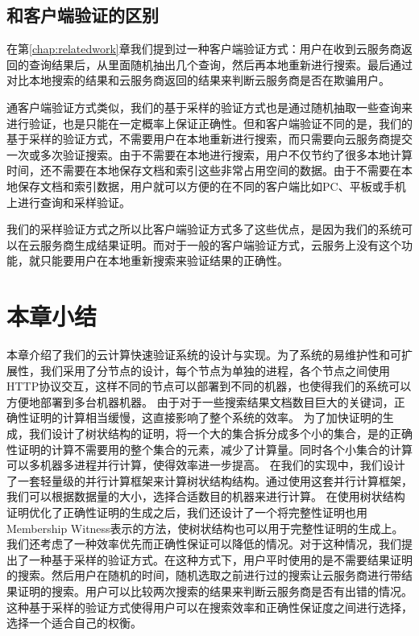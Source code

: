 \subsection{和客户端验证的区别}
在第\ref{chap:relatedwork}章我们提到过一种客户端验证方式：用户在收到云服务商返回的查询结果后，从里面随机抽出几个查询，然后再本地重新进行搜索。最后通过对比本地搜索的结果和云服务商返回的结果来判断云服务商是否在欺骗用户。

通客户端验证方式类似，我们的基于采样的验证方式也是通过随机抽取一些查询来进行验证，也是只能在一定概率上保证正确性。但和客户端验证不同的是，我们的基于采样的验证方式，不需要用户在本地重新进行搜索，而只需要向云服务商提交一次或多次验证搜索。由于不需要在本地进行搜索，用户不仅节约了很多本地计算时间，还不需要在本地保存文档和索引这些非常占用空间的数据。由于不需要在本地保存文档和索引数据，用户就可以方便的在不同的客户端比如PC、平板或手机上进行查询和采样验证。

我们的采样验证方式之所以比客户端验证方式多了这些优点，是因为我们的系统可以在云服务商生成结果证明。而对于一般的客户端验证方式，云服务上没有这个功能，就只能要用户在本地重新搜索来验证结果的正确性。

\section{本章小结}
本章介绍了我们的云计算快速验证系统的设计与实现。为了系统的易维护性和可扩展性，我们采用了分节点的设计，每个节点为单独的进程，各个节点之间使用HTTP协议交互，这样不同的节点可以部署到不同的机器，也使得我们的系统可以方便地部署到多台机器机器。
由于对于一些搜索结果文档数目巨大的关键词，正确性证明的计算相当缓慢，这直接影响了整个系统的效率。
为了加快证明的生成，我们设计了树状结构的证明，将一个大的集合拆分成多个小的集合，是的正确性证明的计算不需要用的整个集合的元素，减少了计算量。同时各个小集合的计算可以多机器多进程并行计算，使得效率进一步提高。
在我们的实现中，我们设计了一套轻量级的并行计算框架来计算树状结构结构。通过使用这套并行计算框架，我们可以根据数据量的大小，选择合适数目的机器来进行计算。
在使用树状结构证明优化了正确性证明的生成之后，我们还设计了一个将完整性证明也用Membership Witness表示的方法，使树状结构也可以用于完整性证明的生成上。
我们还考虑了一种效率优先而正确性保证可以降低的情况。对于这种情况，我们提出了一种基于采样的验证方式。在这种方式下，用户平时使用的是不需要结果证明的搜索。然后用户在随机的时间，随机选取之前进行过的搜索让云服务商进行带结果证明的搜索。用户可以比较两次搜索的结果来判断云服务商是否有出错的情况。这种基于采样的验证方式使得用户可以在搜索效率和正确性保证度之间进行选择，选择一个适合自己的权衡。
